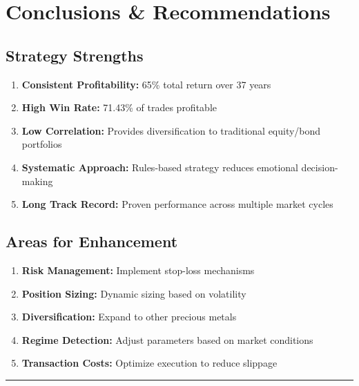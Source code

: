 \documentclass[11pt,a4paper]{article}
\begin{document}
\newpage

\section{Conclusions \& Recommendations}

\subsection{Strategy Strengths}

\begin{enumerate}
    \item \textbf{Consistent Profitability:} 65\% total return over 37 years
    \item \textbf{High Win Rate:} 71.43\% of trades profitable
    \item \textbf{Low Correlation:} Provides diversification to traditional equity/bond portfolios
    \item \textbf{Systematic Approach:} Rules-based strategy reduces emotional decision-making
    \item \textbf{Long Track Record:} Proven performance across multiple market cycles
\end{enumerate}

\subsection{Areas for Enhancement}

\begin{enumerate}
    \item \textbf{Risk Management:} Implement stop-loss mechanisms
    \item \textbf{Position Sizing:} Dynamic sizing based on volatility
    \item \textbf{Diversification:} Expand to other precious metals
    \item \textbf{Regime Detection:} Adjust parameters based on market conditions
    \item \textbf{Transaction Costs:} Optimize execution to reduce slippage
\end{enumerate}

\vspace{1cm}

\hrule

\vspace{0.5cm}
\end{document}
